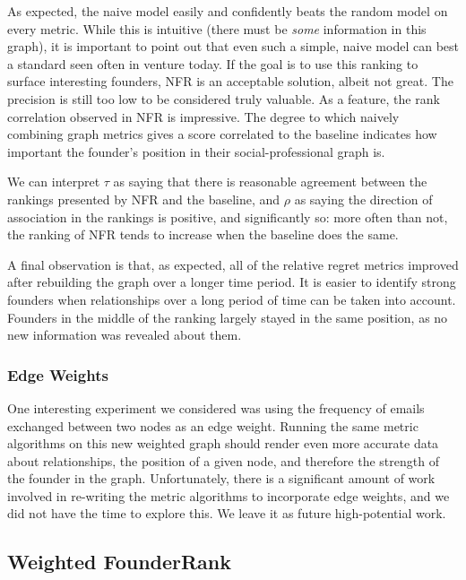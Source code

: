 As expected, the naive model easily and confidently beats the random model on every metric. While this is intuitive (there must be \textit{some} information in this graph), it is important to point out that even such a simple, naive model can best a standard seen often in venture today. If the goal is to use this ranking to surface interesting founders, NFR is an acceptable solution, albeit not great. The precision is still too low to be considered truly valuable. As a feature, the rank correlation observed in NFR is impressive. The degree to which naively combining graph metrics gives a score correlated to the baseline indicates how important the founder's position in their social-professional graph is.

We can interpret $\tau$ as saying that there is reasonable agreement between the rankings presented by NFR and the baseline, and $\rho$ as saying the direction of association in the rankings is positive, and significantly so: more often than not, the ranking of NFR tends to increase when the baseline does the same.

A final observation is that, as expected, all of the relative regret metrics improved after rebuilding the graph over a longer time period. It is easier to identify strong founders when relationships over a long period of time can be taken into account. Founders in the middle of the ranking largely stayed in the same position, as no new information was revealed about them.

\subsubsection{Edge Weights}

One interesting experiment we considered was using the frequency of emails exchanged between two nodes as an edge weight. Running the same metric algorithms on this new weighted graph should render even more accurate data about relationships, the position of a given node, and therefore the strength of the founder in the graph. Unfortunately, there is a significant amount of work involved in re-writing the metric algorithms to incorporate edge weights, and we did not have the time to explore this. We leave it as future high-potential work.

\subsection{Weighted FounderRank}

